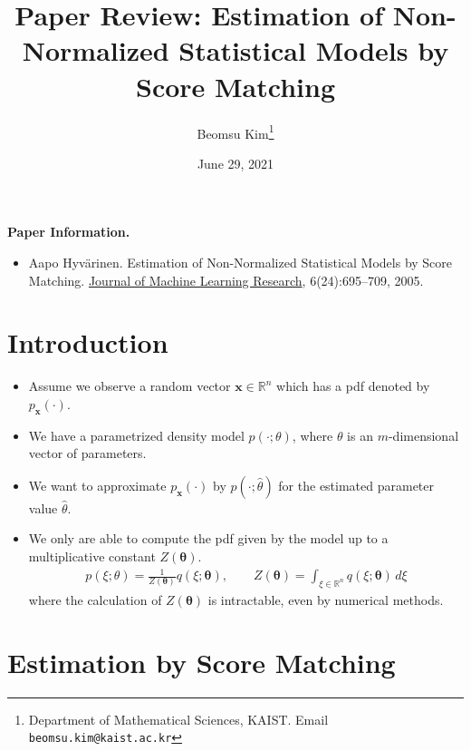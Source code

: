 \documentclass[10pt]{article}
\title{Paper Review: Estimation of Non-Normalized Statistical Models by Score Matching}
\author{Beomsu Kim\footnote{Department of Mathematical Sciences, KAIST. Email \texttt{beomsu.kim@kaist.ac.kr}}}
\date{June 29, 2021}
\newcommand{\RR}{\mathbb{R}}
\begin{document}
\maketitle

\textbf{Paper Information.}

\begin{itemize}
\item Aapo Hyv\"{a}rinen. Estimation of Non-Normalized Statistical Models by Score Matching. \newline \underline{Journal of Machine Learning Research}, 6(24):695--709, 2005.
\end{itemize}

\section{Introduction}

\begin{itemize}
\item Assume we observe a random vector $\mathbf{x} \in \RR^n$ which has a pdf denoted by $p_\mathbf{x}(\cdot)$.
\item We have a parametrized density model $p(\cdot;\theta)$, where $\theta$ is an $m$-dimensional vector of parameters.
\item We want to approximate $p_\mathbf{x}(\cdot)$ by $p(\cdot;\hat{\theta})$ for the estimated parameter value $\hat{\theta}$.
\item We only are able to compute the pdf given by the model up to a multiplicative constant $Z(\bm{\theta})$.
\begin{align*}
p(\xi;\theta) = \frac{1}{Z(\bm{\theta})} q(\xi;\bm{\theta}), \qquad Z(\bm{\theta}) = \int_{\xi \in \RR^n} q(\xi;\bm{\theta}) \, d\xi
\end{align*}
where the calculation of $Z(\bm{\theta})$ is intractable, even by numerical methods.
\end{itemize}

\newpage

\section{Estimation by Score Matching}
\end{document}

